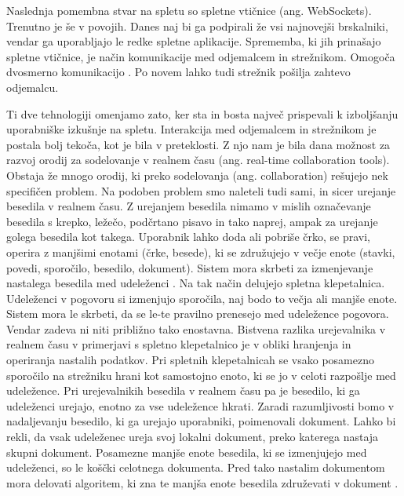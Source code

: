 \documentclass[a4paper, 12pt, twoside]{book}
\begin{document}
Naslednja pomembna stvar na spletu so spletne vtičnice (ang. WebSockets). Trenutno je še v povojih. Danes naj bi ga podpirali že vsi najnovejši brskalniki, vendar ga uporabljajo le redke spletne aplikacije. Sprememba, ki jih prinašajo spletne vtičnice, je način komunikacije med odjemalcem in strežnikom. Omogoča dvosmerno komunikacijo \cite{wave-cs}. Po novem lahko tudi strežnik pošilja zahtevo odjemalcu.

Ti dve tehnologiji omenjamo zato, ker sta in bosta največ prispevali k izboljšanju uporabniške izkušnje na spletu. Interakcija med odjemalcem in strežnikom je postala bolj tekoča, kot je bila v preteklosti. Z njo nam je bila dana možnost za razvoj orodij za sodelovanje v realnem času (ang. real-time collaboration tools). Obstaja že mnogo orodij, ki preko sodelovanja (ang. collaboration) rešujejo nek specifičen problem. Na podoben problem smo naleteli tudi sami, in sicer urejanje besedila v realnem času. Z urejanjem besedila nimamo v mislih označevanje besedila s krepko, ležečo, podčrtano pisavo in tako naprej, ampak za urejanje golega besedila kot takega. Uporabnik lahko doda ali pobriše črko, se pravi, operira z manjšimi enotami (črke, besede), ki se združujejo v večje enote (stavki, povedi, sporočilo, besedilo, dokument). Sistem mora skrbeti za izmenjevanje nastalega besedila med udeleženci \cite{gdocs23}. Na tak način delujejo spletna klepetalnica. Udeleženci v pogovoru si izmenjujo sporočila, naj bodo to večja ali manjše enote. Sistem mora le skrbeti, da se le-te pravilno prenesejo med udeležence pogovora. Vendar zadeva ni niti približno tako enostavna. Bistvena razlika urejevalnika v realnem času v primerjavi s spletno klepetalnico je v obliki hranjenja in operiranja nastalih podatkov. Pri spletnih klepetalnicah se vsako posamezno sporočilo na strežniku hrani kot samostojno enoto, ki se jo v celoti razpošlje med udeležence. Pri urejevalnikih besedila v realnem času pa je besedilo, ki ga udeleženci urejajo, enotno za vse udeležence hkrati. Zaradi razumljivosti bomo v nadaljevanju besedilo, ki ga urejajo uporabniki, poimenovali dokument. Lahko bi rekli, da vsak udeleženec ureja svoj lokalni dokument, preko katerega nastaja skupni dokument. Posamezne manjše enote besedila, ki se izmenjujejo med udeleženci, so le koščki celotnega dokumenta. Pred tako nastalim dokumentom mora delovati algoritem, ki zna te manjša enote besedila združevati v dokument \cite{gdocs22}.

\end{document}
